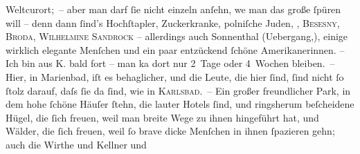\begin{ledgroupsized}[t]{13cm}
               Weltcurort; – aber man darf ſie nicht einzeln anſehn, we{\geminationn} man das große ſpüren will – denn dann ſind’s Hochſtapler, Zuckerkranke, polniſche Juden, \label{K_L00462-1v}\label{K_L00462-1h}, \textsc{Besesny}, \textsc{Broda}, \textsc{Wilhelmine Sandrock} – allerdings auch Sonnenthal
               (Uebergang,), einige wirklich elegante Menſchen und ein paar entzückend ſchöne
               Amerikanerinnen. – Ich bin aus \textsc{K}. {\pb}bald fort – man ka{\geminationn}
               dort nur 2 Tage oder 4 Wochen bleiben. – Hier, in Marienbad, iſt es behaglicher, und die Leute, die hier ſind, ſind nicht ſo
               ſtolz darauf, daſs ſie da ſind, wie in \textsc{Karlsbad}. – Ein großer freundlicher Park, in dem hohe ſchöne Häuſer ſtehn, die lauter
               Hotels ſind, und ringsherum beſcheidene Hügel, die ſich freuen, weil man breite Wege
               zu ihnen hingeführt hat, und Wälder, die ſich freuen, weil ſo brave dicke Menſchen in
               ihnen ſpazieren gehn; auch die Wirthe und Kellner {\pb}und

\end{ledgroupsized}
